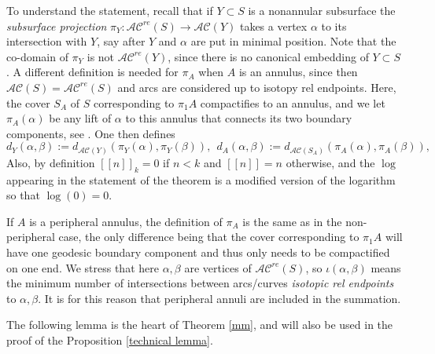 \documentclass[11pt]{amsart}
\theoremstyle{remark}
\numberwithin{equation}{section}
\newcommand{\cAC}{\mathcal{AC}}
\newcommand{\acre}{\cAC^{re}}
\begin{document}
 To understand the statement, recall that if $Y\subset S$  is a nonannular subsurface the \emph{subsurface projection} $\pi_Y : \acre(S) \longrightarrow \cAC(Y)$ takes a vertex $\alpha$  to its intersection with $Y$, say after $Y$ and $\alpha$ are put in minimal position. Note that the co-domain of $\pi_Y$ is not $\acre(Y)$, since there is no canonical embedding of $Y\subset S$.
 A different definition is needed for $\pi_A$ when $A$ is an annulus, since then $\cAC(S)=\acre(S)$ and arcs are considered up to isotopy rel endpoints. Here, the cover $S_A$ of $S$ corresponding to $\pi_1 A$  compactifies to an annulus, and we let $\pi_A(\alpha)$ be  any lift of $\alpha$ to this annulus that  connects its two boundary components, see \cite{Masurgeometry2}.  One then defines $$d_Y(\alpha,\beta):=d_{\cAC(Y)}(\pi_Y(\alpha),\pi_Y(\beta)), \ \ d_A(\alpha,\beta):=d_{\cAC(S_A)}(\pi_A(\alpha),\pi_A(\beta)),$$  Also, by definition $[[n]]_k=0$ if $n<k$ and $[[n]]=n$  otherwise, and the $\log$ appearing in the statement of the theorem is a modified version of the logarithm so that $\log(0)= 0$. 
  
If $A$ is a peripheral annulus, the definition of $\pi_{A}$ is the same as in the non-peripheral case, the only difference being that the cover corresponding to $\pi_{1}A$ will have one geodesic boundary component and thus only needs to be compactified on one end. We stress that here $\alpha,\beta$  are vertices of $\acre(S)$, so $\iota(\alpha,\beta) $ means the minimum number of intersections between arcs/curves \emph{isotopic rel endpoints} to $\alpha,\beta$.  It is for this reason that peripheral annuli are included in the summation.

The following lemma is the heart of Theorem \ref{mm},  and will also be used in the proof of the  Proposition \ref {technical lemma}.
\end{document}
